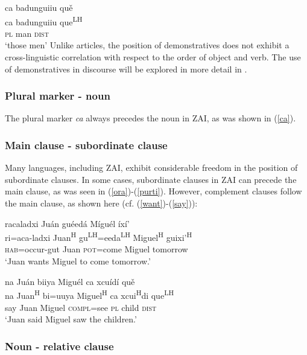\ea\label{ca2}
\glll ca badunguiiu qu\v{e} \\
ca badunguiiu que\textsuperscript{LH} \\
\textsc{pl} man \textsc{dist} \\
\glt `those men'
\z
Unlike articles, the position of demonstratives does not exhibit a cross-linguistic correlation with respect to the order of object and verb. The use of demonstratives in discourse will be explored in more detail in .


\subsubsection{Plural marker - noun}

The plural marker \textit{ca} always precedes the noun in ZAI, as was shown in (\ref{ca}). 


\subsubsection{Main clause - subordinate clause}

Many languages, including ZAI, exhibit considerable freedom in the position of subordinate clauses. In some cases,  subordinate clauses in ZAI can precede the main clause, as was seen in (\ref{ora})-(\ref{purti}). However, complement clauses follow the main clause, as shown here (cf. (\ref{want})-(\ref{say})): 


\ea\label{want}
\glll racaladxi Ju\'{a}n gu\'{e}ed\'{a} M\'{i}gu\'{e}l \'{i}x\'{i}' \\
ri=aca-ladxi Juan\textsuperscript{H} gu\textsuperscript{LH}=eeda\textsuperscript{LH} Miguel\textsuperscript{H}  guixi'\textsuperscript{H}  \\
\textsc{hab}=occur-gut Juan \textsc{pot}=come Miguel tomorrow \\
\glt `Juan wants Miguel to come tomorrow.' 
\z

\ea\label{say}
\glll na Ju\'{a}n biiya Migu\'{e}l ca xcu\'{i}d\'{i} qu\v{e} \\
na Juan\textsuperscript{H} bi=uuya Miguel\textsuperscript{H} ca xcui\textsuperscript{H}di que\textsuperscript{LH} \\
say Juan Miguel \textsc{compl}=see \textsc{pl} child \textsc{dist} \\
\glt `Juan said Miguel saw the children.' 
\z

	
	
\subsubsection{Noun - relative clause}

